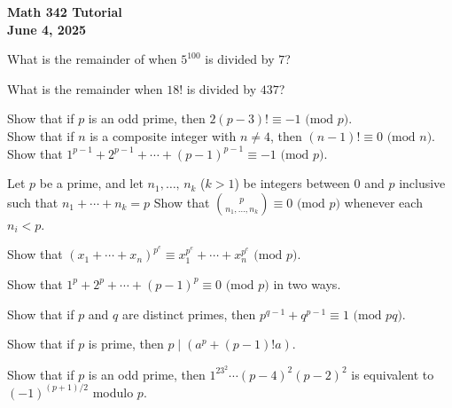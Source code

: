 \documentclass[a4paper,11pt]{article}
\theoremstyle{mythm}
\theoremstyle{mydef}
\renewcommand{\pmod}[1]{\text{ (mod $#1$)}}
\begin{document}
\begin{center}
  {\Large\bfseries Math 342 Tutorial} \\
  {\normalsize\bf June 4, 2025}
\end{center}

\begin{enumerate*}[{\bf (a)}]
\item What is the remainder of when $5^{100}$ is divided by $7$?
\item What is the remainder when $18!$ is divided by $437$? \\
\end{enumerate*}

 Show that if $p$ is an odd prime, then $2(p-3)! \equiv
-1 \pmod{p}$. \\

 Show that if $n$ is a composite integer with $n \neq
4$, then $(n-1)! \equiv 0 \pmod{n}$. \\

 Show that $1^{p-1}+2^{p-1}+\cdots+(p-1)^{p-1} \equiv
-1 \pmod{p}$. \\

\begin{enumerate*}[{\bf (a)}]
\item Let $p$ be a prime, and let $n_1,\dots,\,n_k$ ($k>1$) be integers between
  0 and $p$ inclusive such that $n_1+\cdots+n_k=p$ Show that
  $\binom{p}{n_1,\dots,n_k} \equiv 0 \pmod{p}$ whenever each $n_i < p$.
\item Show that $(x_1+\cdots+x_n)^{p^e} \equiv x_1^{p^e}+\cdots+x_n^{p^e} \pmod{p}$.
\item Show that $1^p+2^p+\cdots+(p-1)^p \equiv 0 \pmod{p}$ in two ways. \\
\end{enumerate*}

\begin{enumerate*}[{\bf (a)}]
\item Show that if $p$ and $q$ are distinct primes, then $p^{q-1}+q^{p-1} \equiv
  1 \pmod{pq}$.
\item Show that if $p$ is prime, then $p \mid (a^p+(p-1)!a)$.
\item Show that if $p$ is an odd prime, then $1^23^2 \cdots (p-4)^2(p-2)^2$ is
  equivalent to $(-1)^{(p+1)/2}$ modulo $p$. \\
\end{enumerate*}
\end{document}
